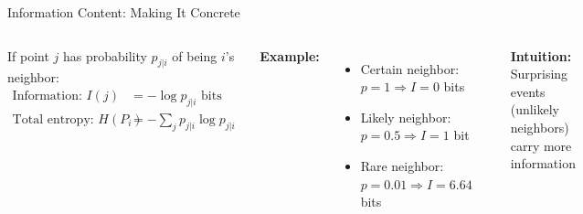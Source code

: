 \documentclass[aspectratio=169]{beamer}
\newcommand{\intuition}[1]{\colorbox{green!10}{\textcolor{intuitioncolor}{\textbf{Intuition:} #1}}}
\begin{document}
\begin{frame}{Information Content: Making It Concrete}
\begin{columns}
If point $j$ has probability $p_{j|i}$ of being $i$'s neighbor:
\begin{align}
\text{Information: } I(j) &= -\log p_{j|i} \text{ bits}\\
\text{Total entropy: } H(P_i) &= -\sum_j p_{j|i}\log p_{j|i}
\end{align}

\vspace{0.3cm}
\textbf{Example:}
\begin{itemize}
\item Certain neighbor: $p = 1 \Rightarrow I = 0$ bits
\item Likely neighbor: $p = 0.5 \Rightarrow I = 1$ bit
\item Rare neighbor: $p = 0.01 \Rightarrow I = 6.64$ bits
\end{itemize}

\includegraphics[width=\textwidth]{./Figures/information_visual.png}

\intuition{Surprising events (unlikely neighbors) carry more information}
\end{columns}
\end{frame}
\end{document}
